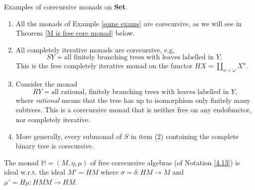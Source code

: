 \documentclass{LMCS}
\theoremstyle{plain}
\theoremstyle{definition}
\numberwithin{equation}{section}
\begin{document}
\begin{exa}\label{5.4}
Examples of corecursive monads on {\bf Set}.
\begin{enumerate}
\item All the monads of Example \ref{some exams} are corecursive, as we will see in  Theorem \ref{M is free core monad} below.

\item All completely iterative monads are corecursive, e.g,
$$SY=\text{all finitely branching trees with leaves labelled in $Y$},$$
This is the free completely iterative monad on the functor $HX=\coprod_{n<\omega} X^n$.

\item Consider the monad $$RY=\text{all rational, finitely branching trees with leaves labelled in $Y$,}$$
where \emph{rational} means that the tree has up to isomorphism only finitely many subtrees. This is a corecursive monad that is neither free on any endofunctor, nor completely iterative.

\item More generally, every submonad of $S$ in item (2) containing the
  complete binary tree  is corecursive.
\end{enumerate}
\end{exa}




\begin{prop}\label{M is ideal monad}
The monad $\mathbb{M}=(M,\eta,\mu)$ of  free corecursive algebras (of Notation \ref{4.13}) is  ideal w.r.t. the ideal $M'=HM$ where $\sigma= \delta:HM\rightarrow M$ and $\mu'=H\mu:HMM\rightarrow HM$.
\end{prop}
\end{document}
